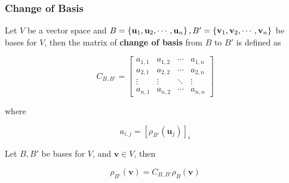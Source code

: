 \documentclass[a4paper,12pt]{article}
\begin{document}
\subsubsection{Change of Basis}
\begin{dft}
  Let $V$ be a vector space and $B=\left\{ \mathbf{u}_{1},\mathbf{u}_{2},\cdots,\mathbf{u}_{n}\right\},B'=\left\{ \mathbf{v}_{1},\mathbf{v}_{2},\cdots,\mathbf{v}_{n}\right\}$ be bases for $V$, then the matrix of \textbf{change of basis} from $B$ to $B'$ is defined as

  $$C_{B,B'}=\begin{bmatrix}
    a_{1,1} & a_{1,2} & \cdots & a_{1,n}\\
    a_{2,1} & a_{2,2} & \cdots & a_{2,n}\\
    \vdots & \vdots & \ddots & \vdots\\
    a_{n,1} & a_{n,2} & \cdots & a_{n,n}
  \end{bmatrix}$$\s

  where

  $$a_{i,j}=[\rho_{B'}(\mathbf{u}_{j})]_{i}$$
\end{dft}\n

\begin{thm}
  Let $B,B'$ be bases for $V$, and $\mathbf{v}\in V$, then

  $$\rho_{B'}(\mathbf{v})=C_{B,B'}\rho_{B}(\mathbf{v})$$
\end{thm}\n
\end{document}
